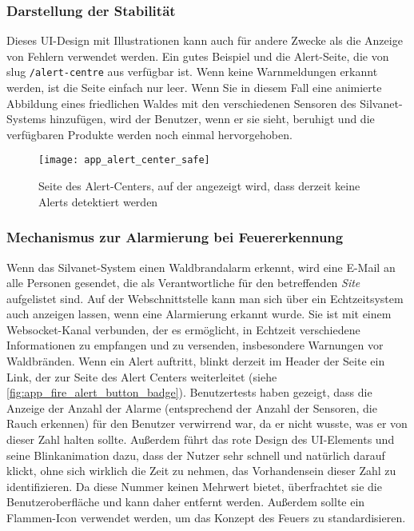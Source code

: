 \subsubsection{Darstellung der Stabilität}

Dieses UI-Design mit Illustrationen kann auch für andere Zwecke als die Anzeige von Fehlern verwendet werden.
Ein gutes Beispiel und die Alert-Seite, die von slug \lstinline{/alert-centre} aus verfügbar ist.
Wenn keine Warnmeldungen erkannt werden, ist die Seite einfach nur leer.
Wenn Sie in diesem Fall eine animierte Abbildung eines friedlichen Waldes mit den verschiedenen Sensoren des Silvanet-Systems hinzufügen, wird der Benutzer, wenn er sie sieht, beruhigt und die verfügbaren Produkte werden noch einmal hervorgehoben.

\begin{figure}[H]
  \centering
  \texttt{[image: app\_alert\_center\_safe]}
  \caption{Seite des Alert-Centers, auf der angezeigt wird, dass derzeit keine Alerts detektiert werden}
  \label{fig:app_alert_center_safe}
\end{figure}

\subsubsection{Mechanismus zur Alarmierung bei Feuererkennung}

Wenn das Silvanet-System einen Waldbrandalarm erkennt, wird eine E-Mail an alle Personen gesendet, die als Verantwortliche für den betreffenden \textit{Site} aufgelistet sind.
Auf der Webschnittstelle kann man sich über ein Echtzeitsystem auch anzeigen lassen, wenn eine Alarmierung erkannt wurde.
Sie ist mit einem Websocket-Kanal verbunden, der es ermöglicht, in Echtzeit verschiedene Informationen zu empfangen und zu versenden, insbesondere Warnungen vor Waldbränden.
Wenn ein Alert auftritt, blinkt derzeit im Header der Seite ein Link, der zur Seite des Alert Centers weiterleitet (siehe \ref{fig:app_fire_alert_button_badge}).
Benutzertests haben gezeigt, dass die Anzeige der Anzahl der Alarme (entsprechend der Anzahl der Sensoren, die Rauch erkennen) für den Benutzer verwirrend war, da er nicht wusste, was er von dieser Zahl halten sollte.
Außerdem führt das rote Design des \ac{UI}-Elements und seine Blinkanimation dazu, dass der Nutzer sehr schnell und natürlich darauf klickt, ohne sich wirklich die Zeit zu nehmen, das Vorhandensein dieser Zahl zu identifizieren.
Da diese Nummer keinen Mehrwert bietet, überfrachtet sie die Benutzeroberfläche und kann daher entfernt werden. Außerdem sollte ein Flammen-Icon verwendet werden, um das Konzept des Feuers zu standardisieren.

